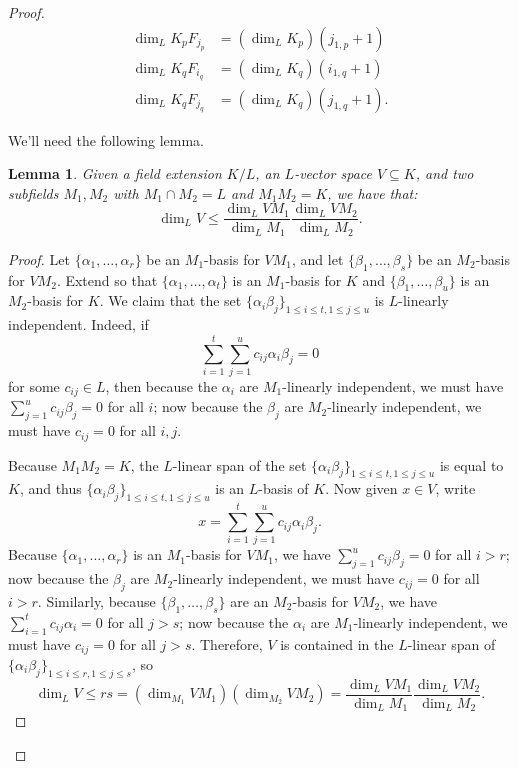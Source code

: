 \documentclass[letterpaper,10pt]{amsart}
\newtheorem{lemma}[theorem]{Lemma}
\theoremstyle{definition}
\theoremstyle{remark}
\begin{document}
\begin{proof}
\begin{align}
\label{eqn:dim-comp-pq-jp}
\dim_L K_p F_{j_p} &= (\dim_L K_p)(j_{1,p}+1) \\
\label{eqn:dim-comp-pq-iq}
\dim_L K_q F_{i_q} &= (\dim_L K_q)(i_{1,q}+1) \\
\label{eqn:dim-comp-pq-jq}
\dim_L K_q F_{j_q} &= (\dim_L K_q)(j_{1,q}+1).
\end{align}

We'll need the following lemma.
\begin{lemma}
\label{lem:helper}
Given a field extension $K/L$, an $L$-vector space $V \subseteq K$, and two subfields $M_1,M_2$ with $M_1 \cap M_2 = L$ and $M_1M_2 = K$, we have that: 
\[
	\dim_{L} V \leq \frac{\dim_{L}VM_1}{\dim_{L}M_1}\frac{\dim_{L}VM_2}{\dim_{L}M_2}. 
\]
\end{lemma}
\begin{proof}
Let $\{\alpha_1,\dots,\alpha_r\}$ be an $M_1$-basis for $VM_1$, and let $\{\beta_1,\dots,\beta_s\}$ be an $M_2$-basis for $VM_2$. 
Extend so that $\{\alpha_1,\dots,\alpha_t\}$ is an $M_1$-basis for $K$ and $\{\beta_1,\dots,\beta_u\}$ is an $M_2$-basis for $K$.  We claim that the set $\{\alpha_i\beta_j\}_{1 \leq i \leq t, 1 \leq j \leq u}$ is $L$-linearly independent. Indeed, if
\[
	\sum_{i = 1}^t\sum_{j = 1}^u c_{ij}\alpha_i\beta_j = 0
\]
for some $c_{ij} \in L$, then because the $\alpha_i$ are $M_1$-linearly independent, we must have $\sum_{j = 1}^u c_{ij}\beta_j = 0$ for all $i$; now because the $\beta_j$ are $M_2$-linearly independent, we must have $c_{ij} = 0$ for all $i,j$.

Because $M_1M_2 = K$, the $L$-linear span of the set $\{\alpha_i\beta_j\}_{1 \leq i \leq t, 1 \leq j \leq u}$ is equal to $K$, and thus $\{\alpha_i\beta_j\}_{1 \leq i \leq t, 1 \leq j \leq u}$ is an $L$-basis of $K$. Now given $x \in V$, write 
\[
	x = \sum_{i = 1}^t\sum_{j = 1}^u c_{ij}\alpha_i\beta_j.
\]
Because $\{\alpha_1,\dots,\alpha_r\}$ is an $M_1$-basis for $VM_1$, we have $\sum_{j = 1}^u c_{ij}\beta_j = 0$ for all $i > r$; now because the $\beta_j$ are $M_2$-linearly independent, we must have $c_{ij} = 0$ for all $i>r$. Similarly, because $\{\beta_1,\dots,\beta_s\}$ are an $M_2$-basis for $VM_2$, we have $\sum_{i = 1}^t c_{ij}\alpha_i = 0$ for all $j > s$; now because the $\alpha_i$ are $M_1$-linearly independent, we must have $c_{ij} = 0$ for all $j>s$. Therefore, $V$ is contained in the $L$-linear span of $\{\alpha_i\beta_j\}_{1 \leq i \leq r, 1 \leq j \leq s}$, so
\[
	\dim_{L} V \leq rs = (\dim_{M_1} VM_1) (\dim_{M_2} VM_2) =  \frac{\dim_{L}VM_1}{\dim_{L}M_1}\frac{\dim_{L}VM_2}{\dim_{L}M_2}. 
\]


\end{proof}
\end{proof}
\end{document}
